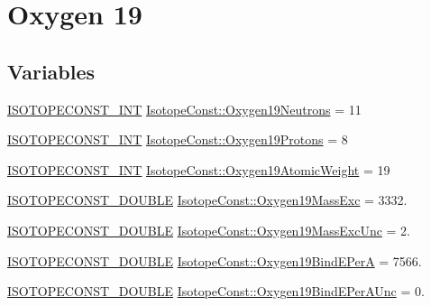 \hypertarget{group___isotope_const-_oxygen-_o19}{}\section{Oxygen 19}
\label{group___isotope_const-_oxygen-_o19}
\subsection*{Variables}
\begin{DoxyCompactItemize}
\item 
\mbox{\hyperlink{group___isotope_const-_macros_ga5f18360b3e99483a35c32d789e62621c}{I\+S\+O\+T\+O\+P\+E\+C\+O\+N\+S\+T\+\_\+\+I\+NT}} \mbox{\hyperlink{group___isotope_const-_oxygen-_o19_ga31c132472721371518f2551fc4137959}{Isotope\+Const\+::\+Oxygen19\+Neutrons}} = 11
\item 
\mbox{\hyperlink{group___isotope_const-_macros_ga5f18360b3e99483a35c32d789e62621c}{I\+S\+O\+T\+O\+P\+E\+C\+O\+N\+S\+T\+\_\+\+I\+NT}} \mbox{\hyperlink{group___isotope_const-_oxygen-_o19_gad62836019bfa8e2075470fbf1554db84}{Isotope\+Const\+::\+Oxygen19\+Protons}} = 8
\item 
\mbox{\hyperlink{group___isotope_const-_macros_ga5f18360b3e99483a35c32d789e62621c}{I\+S\+O\+T\+O\+P\+E\+C\+O\+N\+S\+T\+\_\+\+I\+NT}} \mbox{\hyperlink{group___isotope_const-_oxygen-_o19_gab1120990541b301f60016e3874b4a0e4}{Isotope\+Const\+::\+Oxygen19\+Atomic\+Weight}} = 19
\item 
\mbox{\hyperlink{group___isotope_const-_macros_ga8f45a7272ce02c0b4c65c44636ed719a}{I\+S\+O\+T\+O\+P\+E\+C\+O\+N\+S\+T\+\_\+\+D\+O\+U\+B\+LE}} \mbox{\hyperlink{group___isotope_const-_oxygen-_o19_ga220db92948d0afd8b149aeb0395ae902}{Isotope\+Const\+::\+Oxygen19\+Mass\+Exc}} = 3332.
\item 
\mbox{\hyperlink{group___isotope_const-_macros_ga8f45a7272ce02c0b4c65c44636ed719a}{I\+S\+O\+T\+O\+P\+E\+C\+O\+N\+S\+T\+\_\+\+D\+O\+U\+B\+LE}} \mbox{\hyperlink{group___isotope_const-_oxygen-_o19_gabbe0b66b430881fe5374236abdaf715c}{Isotope\+Const\+::\+Oxygen19\+Mass\+Exc\+Unc}} = 2.
\item 
\mbox{\hyperlink{group___isotope_const-_macros_ga8f45a7272ce02c0b4c65c44636ed719a}{I\+S\+O\+T\+O\+P\+E\+C\+O\+N\+S\+T\+\_\+\+D\+O\+U\+B\+LE}} \mbox{\hyperlink{group___isotope_const-_oxygen-_o19_gafe6d72d545329ddd597537759071f584}{Isotope\+Const\+::\+Oxygen19\+Bind\+E\+PerA}} = 7566.
\item 
\mbox{\hyperlink{group___isotope_const-_macros_ga8f45a7272ce02c0b4c65c44636ed719a}{I\+S\+O\+T\+O\+P\+E\+C\+O\+N\+S\+T\+\_\+\+D\+O\+U\+B\+LE}} \mbox{\hyperlink{group___isotope_const-_oxygen-_o19_ga98fdfc9019921679ce86e8e3d566c7ae}{Isotope\+Const\+::\+Oxygen19\+Bind\+E\+Per\+A\+Unc}} = 0.

\end{DoxyCompactItemize}
